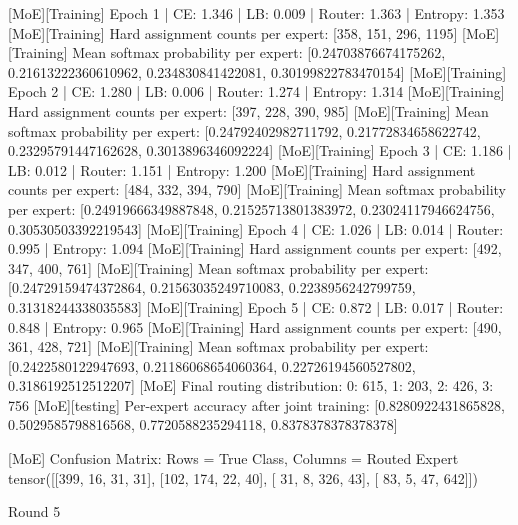 [MoE][Training] Epoch 1 | CE: 1.346 | LB: 0.009 | Router: 1.363 | Entropy: 1.353
[MoE][Training] Hard assignment counts per expert: [358, 151, 296, 1195]
[MoE][Training] Mean softmax probability per expert: [0.24703876674175262, 0.21613222360610962, 0.234830841422081, 0.30199822783470154]
[MoE][Training] Epoch 2 | CE: 1.280 | LB: 0.006 | Router: 1.274 | Entropy: 1.314
[MoE][Training] Hard assignment counts per expert: [397, 228, 390, 985]
[MoE][Training] Mean softmax probability per expert: [0.24792402982711792, 0.21772834658622742, 0.23295791447162628, 0.3013896346092224]
[MoE][Training] Epoch 3 | CE: 1.186 | LB: 0.012 | Router: 1.151 | Entropy: 1.200
[MoE][Training] Hard assignment counts per expert: [484, 332, 394, 790]
[MoE][Training] Mean softmax probability per expert: [0.24919666349887848, 0.21525713801383972, 0.23024117946624756, 0.30530503392219543]
[MoE][Training] Epoch 4 | CE: 1.026 | LB: 0.014 | Router: 0.995 | Entropy: 1.094
[MoE][Training] Hard assignment counts per expert: [492, 347, 400, 761]
[MoE][Training] Mean softmax probability per expert: [0.24729159474372864, 0.21563035249710083, 0.2238956242799759, 0.31318244338035583]
[MoE][Training] Epoch 5 | CE: 0.872 | LB: 0.017 | Router: 0.848 | Entropy: 0.965
[MoE][Training] Hard assignment counts per expert: [490, 361, 428, 721]
[MoE][Training] Mean softmax probability per expert: [0.2422580122947693, 0.21186068654060364, 0.22726194560527802, 0.3186192512512207]
[MoE] Final routing distribution: {0: 615, 1: 203, 2: 426, 3: 756}
[MoE][testing] Per-expert accuracy after joint training: [0.8280922431865828, 0.5029585798816568, 0.7720588235294118, 0.8378378378378378]

[MoE] Confusion Matrix: Rows = True Class, Columns = Routed Expert
tensor([[399,  16,  31,  31],
[102, 174,  22,  40],
[ 31,   8, 326,  43],
[ 83,   5,  47, 642]])

Round 5


